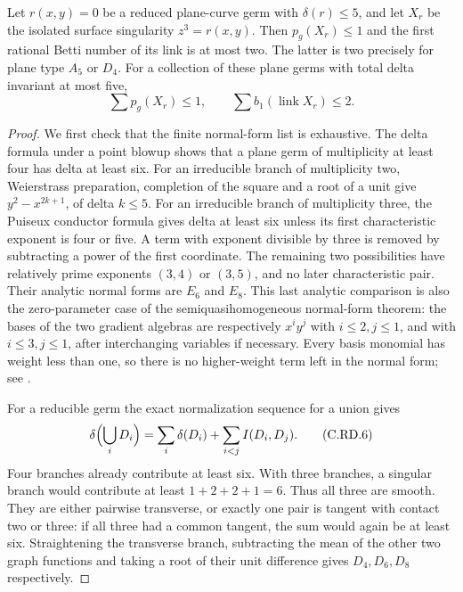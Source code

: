 
\begin{proposition}\label{cdp:st:C.2.RAT.6}
Let $r(x,y)=0$ be a reduced plane-curve germ with
$\delta(r)\le5$, and let $X_r$ be the isolated surface
singularity $z^3=r(x,y)$. Then $p_g(X_r)\le1$ and the
first rational Betti number of its link is at most two.
The latter is two precisely for plane type $A_5$ or $D_4$.
For a collection of these plane germs with total delta
invariant at most five,
\[
             \sum p_g(X_r)\le1,
           \qquad \sum b_1(\operatorname{link}X_r)\le2.
\tag{C.RD.5}\label{cdp:eq:C.RD.5}
\]
\end{proposition}
\begin{proof}
We first check that the finite normal-form list is exhaustive.
The delta formula under a point blowup shows that a plane
germ of multiplicity at least four has delta at least six.
For an irreducible branch of multiplicity two,
Weierstrass preparation, completion of the square and a
root of a unit give $y^2-x^{2k+1}$, of delta $k\le5$.
For an irreducible branch of multiplicity three, the
Puiseux conductor formula gives delta at least six
unless its first characteristic exponent is four or
five. A term with exponent divisible by three is removed
by subtracting a power of the first coordinate. The
remaining two possibilities have relatively prime
exponents $(3,4)$ or $(3,5)$, and no later characteristic
pair. Their analytic normal forms are $E_6$ and $E_8$.
This last analytic comparison is also the zero-parameter
case of the semiquasihomogeneous normal-form theorem:
the bases of the two gradient algebras are respectively
$x^i y^j$ with $i\le2,j\le1$, and with
$i\le3,j\le1$, after interchanging variables if necessary.
Every basis monomial has weight less than one, so there
is no higher-weight term left in the normal form; see
\cite[\S1, I.1.0, and \S2]{Arnold1976NormalForms}.

For a reducible germ the exact normalization sequence
for a union gives
\[
 \delta\Bigl(\bigcup_i D_i\Bigr)
       =\sum_i\delta(D_i)+\sum_{i<j}I(D_i,D_j).
\tag{C.RD.6}\label{cdp:eq:C.RD.6}
\]
Four branches already contribute at least six.
With three branches, a singular branch would contribute
at least $1+2+2+1=6$. Thus all three are smooth.
They are either pairwise transverse, or exactly one
pair is tangent with contact two or three: if all
three had a common tangent, the sum would again be
at least six. Straightening the transverse branch,
subtracting the mean of the other two graph functions
and taking a root of their unit difference gives
$D_4,D_6,D_8$ respectively.


\end{proof}
